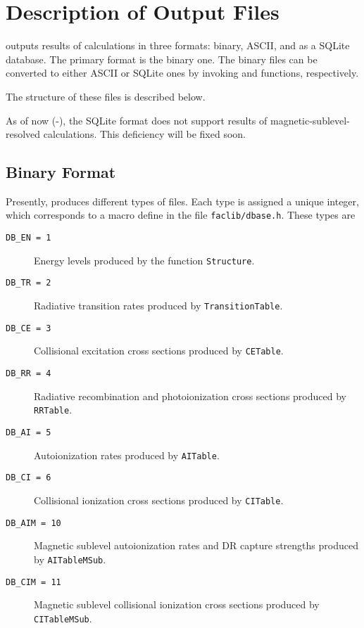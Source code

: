 \chapter{Description of Output Files}
\label{cha:format}
\cFAC outputs results of calculations in three formats: binary, ASCII, and as a
SQLite database. The primary format is the binary one. The binary files can be
converted to either ASCII or SQLite ones by invoking  and 
 functions, respectively.

The structure of these files is described below.

As of now (\cFAC-\facversion), the SQLite format does not support results of
magnetic-sublevel-resolved calculations. This deficiency will be fixed soon.

\section{Binary Format}
\label{sec:binary}
Presently, \cFAC produces different types of files. Each type is assigned
a unique integer, which corresponds to a macro define in the file
\verb|faclib/dbase.h|. These types are
\begin{description}
\item[\texttt{DB\_EN = 1}] Energy levels produced by the function
\verb|Structure|. 
\item[\texttt{DB\_TR = 2}] Radiative transition rates produced by
\verb|TransitionTable|.
\item[\texttt{DB\_CE = 3}] Collisional excitation cross sections produced by
\verb|CETable|. 
\item[\texttt{DB\_RR = 4}] Radiative recombination and photoionization cross
sections produced by \verb|RRTable|.
\item[\texttt{DB\_AI = 5}] Autoionization rates produced by \verb|AITable|.
\item[\texttt{DB\_CI = 6}] Collisional ionization cross sections produced by
\verb|CITable|. 
\item[\texttt{DB\_AIM = 10}] Magnetic sublevel autoionization rates and DR
capture strengths produced by \verb|AITableMSub|.
\item[\texttt{DB\_CIM = 11}] Magnetic sublevel collisional ionization cross
  sections produced by \verb|CITableMSub|.
\end{description}

